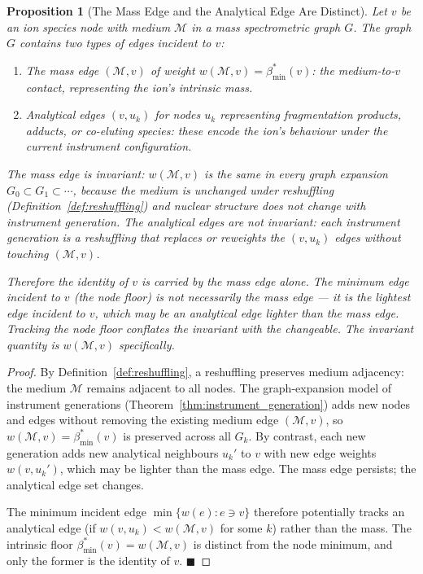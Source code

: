\documentclass[11pt,twocolumn,a4paper]{article}
\theoremstyle{plain}
\newtheorem{proposition}[theorem]{Proposition}
\theoremstyle{definition}
\theoremstyle{remark}
\newcommand{\med}{\mathcal{M}}
\newcommand{\bmin}{\beta_{\min}}
\renewcommand{\qed}{\hfill$\blacksquare$}
\begin{document}
\begin{proposition}[The Mass Edge and the Analytical Edge Are Distinct]
\label{prop:mass_vs_analytical}
Let $v$ be an ion species node with medium $\med$ in a mass spectrometric
graph $G$. The graph $G$ contains two types of edges incident to $v$:
\begin{enumerate}[label=(\roman*)]
  \item The \emph{mass edge} $(\med, v)$ of weight $w(\med, v) = \bmin^*(v)$:
  the medium-to-$v$ contact, representing the ion's intrinsic mass.
  \item \emph{Analytical edges} $(v, u_k)$ for nodes $u_k$ representing
  fragmentation products, adducts, or co-eluting species: these encode the
  ion's behaviour under the current instrument configuration.
\end{enumerate}
The mass edge is invariant: $w(\med, v)$ is the same in every graph expansion
$G_0 \subset G_1 \subset \cdots$, because the medium is unchanged under
reshuffling (Definition~\ref{def:reshuffling}) and nuclear structure does not
change with instrument generation. The analytical edges are not invariant:
each instrument generation is a reshuffling that replaces or reweights the
$(v, u_k)$ edges without touching $(\med, v)$.

Therefore the identity of $v$ is carried by the mass edge alone. The minimum
edge incident to $v$ (the node floor) is not necessarily the mass edge --- it
is the lightest edge incident to $v$, which may be an analytical edge lighter
than the mass edge. Tracking the node floor conflates the invariant with the
changeable. The invariant quantity is $w(\med, v)$ specifically.
\end{proposition}

\begin{proof}
By Definition~\ref{def:reshuffling}, a reshuffling preserves medium adjacency:
the medium $\med$ remains adjacent to all nodes. The graph-expansion model of
instrument generations (Theorem~\ref{thm:instrument_generation}) adds new
nodes and edges without removing the existing medium edge $(\med, v)$, so
$w(\med, v) = \bmin^*(v)$ is preserved across all $G_k$. By contrast, each
new generation adds new analytical neighbours $u_k'$ to $v$ with new edge
weights $w(v, u_k')$, which may be lighter than the mass edge. The mass edge
persists; the analytical edge set changes.

The minimum incident edge $\min\{w(e) : e \ni v\}$ therefore potentially
tracks an analytical edge (if $w(v, u_k) < w(\med, v)$ for some $k$) rather
than the mass. The intrinsic floor $\bmin^*(v) = w(\med, v)$ is distinct from
the node minimum, and only the former is the identity of $v$. \qed
\end{proof}
\end{document}
